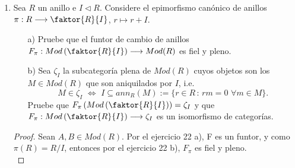 \documentclass{article}
\begin{document}
\begin{enumerate}[label=\textbf{Ej \arabic*.}]
\begin{proof}
			$\boxed{\text{(b)}}$ Note que, por el inciso anterior, todo morfismo de $S$-módulos es un morfismo de $R$-módulos. Más aún, como todo $R$-módulo es un grupo abeliano y como todo morfismo de $R$-módulos preserva sumas, se tiene que $\ringmodhom{S}{M}{N}\leq\ringmodhom{R}{F_{\varphi}\lrprth{M}}{F_{\varphi}\lrprth{N}}\ringmodhom{\varphi \lrprth{R}}{F_{\varphi}\lrprth{M}}{F_{\varphi}\lrprth{N}}$ y que $\ringmodhom{R}{F_{\varphi}\lrprth{M}}{F_{\varphi}\lrprth{N}} \leq \ringmodhom{\mathbb{Z}}{M}{N}$.\\
			
			Por otra parte, $F_{\varphi}$ es fiel, toda vez que a cualesquiera 2 morfismos $f \neq g$ se le asignan morfismos $F_{\varphi} \lrprth{f} = f \neq g = F_{\varphi} \lrprth{g}$. Por otro lado, suponga que $\varphi \lrprth{R}=S$. Dado $f \in \ringmodhom{R}{M}{N}$, éste es un morfismo de $S$-módulos. En efecto, si $s \in S$, entonces $s = \varphi \lrprth{r}$, para alguna $r \in R$. De esta forma, definimos $f\lrprth{s*m}$ como $f\lrprth{s*m}=f\lrprth{rm}$, e inclusive tenemos $F_{\varphi^{-1}} \lrprth{f}=f$. $\therefore F_{\varphi}$ es pleno.\\
		\end{proof}
		
		\item Sea $R$ un anillo e $I\lhd R$. Considere el epimorfismo canónico de anillos $\pi:R\longrightarrow \faktor{R}{I}$,\,\,$r\mapsto r+I$.
		\begin{itemize}
			\item[a)] Pruebe que el funtor de cambio de anillos \\
			$F_\pi:Mod\left(\faktor{R}{I}\right)\longrightarrow Mod(R)$ es fiel y pleno.
			\item[b)] Sea $\zeta_I$ la subcategoría plena de $Mod(R)$ cuyos objetos son los \\
			$M\in Mod(R)$ que son aniquilados por $I$, i.e. 
			\[M\in \zeta_I\,\,\iff\,\,I\subseteq ann_R(M):=\{r\in R\,:\, rm=0\,\,\forall m\in M\}.\]
			Pruebe que $F_\pi\left(Mod\left(\faktor{R}{I}\right)\right)=\zeta_I$ y que $F_\pi:Mod\left(\faktor{R}{I}\right)\longrightarrow \zeta_I$ 
			es un isomorfismo de categorías.
		\end{itemize}
		\begin{proof}
			
			 Sean $A,B\in Mod(R)$. Por el ejercicio 22 a), F es un funtor, y como $\pi(R)=R/I$, entonces  por el ejercicio 22 b), $F_\pi$ es fiel y pleno.\\
			

\end{proof}
\end{enumerate}
\end{document}
